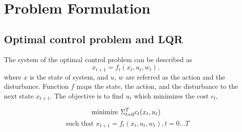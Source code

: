 \section{Problem Formulation}
\subsection{Optimal control problem and LQR}
The system of the optimal control problem can be described as
\begin{equation}
x_{t+1}=f_t(x_t,u_t,w_t),
\end{equation}\newline
where $x$ is the state of system, and $u$, $w$ are referred as the action and the disturbance. Function $f$ maps the state, the action, and the disturbance to the next state $x_{t+1}$. The objective is to find $u_t$ which minimizes the cost $c_t$,\newline

\begin{equation}
    \textrm{minimize }   \Sigma_{t=0}^T c_t(x_t,u_t)  \newline
\end{equation}\newline
\begin{equation}
    \textrm{ such that }   x_{t+1} = f_t(x_t, u_t, w_t), t=0...T
\end{equation}\newline

